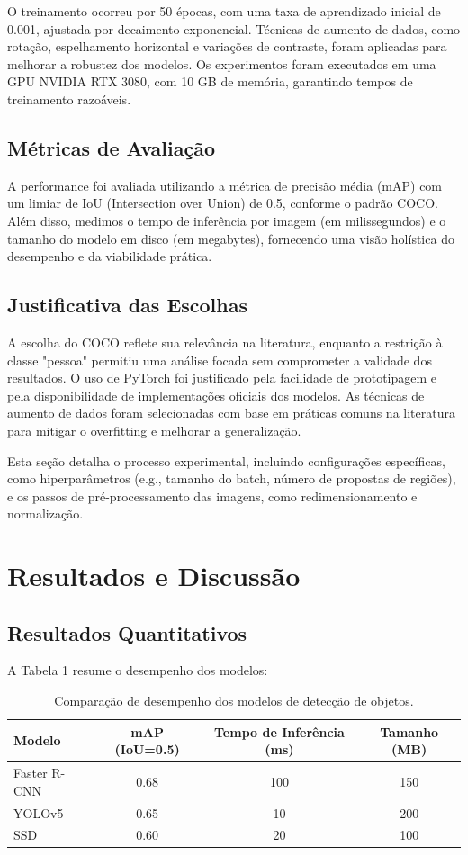 \documentclass[a4paper,12pt]{article}
\begin{document}
	O treinamento ocorreu por 50 épocas, com uma taxa de aprendizado inicial de 0.001, ajustada por decaimento exponencial. Técnicas de aumento de dados, como rotação, espelhamento horizontal e variações de contraste, foram aplicadas para melhorar a robustez dos modelos. Os experimentos foram executados em uma GPU NVIDIA RTX 3080, com 10 GB de memória, garantindo tempos de treinamento razoáveis.
	
	\subsection{Métricas de Avaliação}
	A performance foi avaliada utilizando a métrica de precisão média (mAP) com um limiar de IoU (Intersection over Union) de 0.5, conforme o padrão COCO. Além disso, medimos o tempo de inferência por imagem (em milissegundos) e o tamanho do modelo em disco (em megabytes), fornecendo uma visão holística do desempenho e da viabilidade prática.
	
	\subsection{Justificativa das Escolhas}
	A escolha do COCO reflete sua relevância na literatura, enquanto a restrição à classe "pessoa" permitiu uma análise focada sem comprometer a validade dos resultados. O uso de PyTorch foi justificado pela facilidade de prototipagem e pela disponibilidade de implementações oficiais dos modelos. As técnicas de aumento de dados foram selecionadas com base em práticas comuns na literatura para mitigar o overfitting e melhorar a generalização.
	
	Esta seção detalha o processo experimental, incluindo configurações específicas, como hiperparâmetros (e.g., tamanho do batch, número de propostas de regiões), e os passos de pré-processamento das imagens, como redimensionamento e normalização.
	
	\section{Resultados e Discussão}
	\subsection{Resultados Quantitativos}
	A Tabela 1 resume o desempenho dos modelos:
	
	\begin{table}[h]
		\centering
		\begin{tabular}{lccc}
			\toprule
			Modelo & mAP (IoU=0.5) & Tempo de Inferência (ms) & Tamanho (MB) \\
			\midrule
			Faster R-CNN & 0.68 & 100 & 150 \\
			YOLOv5 & 0.65 & 10 & 200 \\
			SSD & 0.60 & 20 & 100 \\
			\bottomrule
		\end{tabular}
		\caption{Comparação de desempenho dos modelos de detecção de objetos.}
	\end{table}
	
\end{document}
